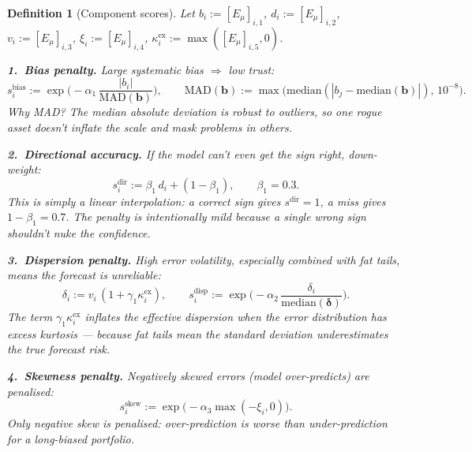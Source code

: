 \documentclass[11pt]{article}
\newtheorem{definition}[theorem]{Definition}
\newcommand{\MAD}{\mathrm{MAD}}
\begin{document}
\begin{definition}[Component scores]\label{def:scores}
Let $b_i:=[E_\mu]_{i,1}$, $d_i:=[E_\mu]_{i,2}$, $v_i:=[E_\mu]_{i,3}$,
$\xi_i:=[E_\mu]_{i,4}$, $\kappa_i^{\mathrm{ex}}:=\max([E_\mu]_{i,5},0)$.

\medskip\noindent
\textbf{1.\ Bias penalty.}  Large systematic bias $\Rightarrow$ low trust:
\begin{equation}\label{eq:sbias}
s_i^{\mathrm{bias}} := \exp\!\bigg(-\alpha_1\,\frac{|b_i|}{\MAD(\bm{b})}\bigg),
\qquad \MAD(\bm{b}):=\max\!\big(\mathrm{median}(|b_j-\mathrm{median}(\bm{b})|),\,10^{-8}\big).
\end{equation}
\emph{Why MAD?}  The median absolute deviation is robust to outliers,
so one rogue asset doesn't inflate the scale and mask problems in others.

\medskip\noindent
\textbf{2.\ Directional accuracy.}  If the model can't even get the sign right, down-weight:
\begin{equation}\label{eq:sdir}
s_i^{\mathrm{dir}} := \beta_1\, d_i + (1-\beta_1),
\qquad \beta_1=0.3.
\end{equation}
This is simply a linear interpolation: a correct sign gives $s^{\mathrm{dir}}=1$,
a miss gives $1-\beta_1=0.7$.  The penalty is intentionally mild because a single
wrong sign shouldn't nuke the confidence.

\medskip\noindent
\textbf{3.\ Dispersion penalty.}  High error volatility, especially combined with fat tails,
means the forecast is unreliable:
\begin{equation}\label{eq:sdisp}
\delta_i := v_i\,(1+\gamma_1\kappa_i^{\mathrm{ex}}),\qquad
s_i^{\mathrm{disp}} := \exp\!\bigg(-\alpha_2\,\frac{\delta_i}{\mathrm{median}(\bm\delta)}\bigg).
\end{equation}
The term $\gamma_1\kappa_i^{\mathrm{ex}}$ inflates the effective dispersion when the error
distribution has excess kurtosis --- because fat tails mean the standard deviation
\emph{underestimates} the true forecast risk.

\medskip\noindent
\textbf{4.\ Skewness penalty.}  Negatively skewed errors (model over-predicts) are
penalised:
\begin{equation}\label{eq:sskew}
s_i^{\mathrm{skew}} := \exp\!\big(-\alpha_3\max(-\xi_i,0)\big).
\end{equation}
Only \emph{negative} skew is penalised: over-prediction is worse than under-prediction
for a long-biased portfolio.
\end{definition}
\end{document}
